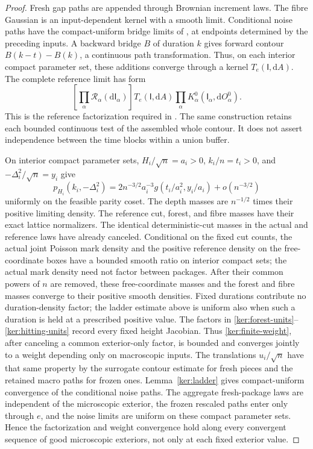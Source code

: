 \documentclass[11pt]{article}
\numberwithin{equation}{section}
\theoremstyle{definition}
\theoremstyle{remark}
\newcommand{\1}{\mathbf 1}
\begin{document}
\begin{proof}
Fresh gap paths are appended through Brownian increment laws.
The fibre Gaussian is an input-dependent kernel with a smooth limit.
Conditional noise paths have the compact-uniform bridge limits of
, at endpoints determined by the preceding inputs.
A backward bridge \(B\) of duration \(k\) gives forward contour
\(B(k-t)-B(k)\), a continuous path transformation. Thus, on each
interior compact parameter set, these additions converge through a
kernel \(T_e(\mathsf I,\mathrm d A)\). The complete reference limit has form
\begin{equation}\label{ker:augmented-reference-limit}
 \left[\prod_\alpha\mathcal R_\alpha(\mathrm d\mathsf I_\alpha)\right]
 T_e(\mathsf I,\mathrm d A)
 \prod_\alpha K^0_\alpha(\mathsf I_\alpha,\mathrm d O^0_\alpha).
\end{equation}
This is the reference factorization required in
. The same construction retains each bounded
continuous test of the assembled whole contour. It does not assert
independence between the time blocks within a union buffer.

On interior compact parameter sets, \(H_i/\sqrt n=a_i>0\),
\(k_i/n=t_i>0\), and \(-\Delta_i^2/\sqrt n=y_i\) give
\[
 p_{H_i}(k_i,-\Delta_i^2)
 =2n^{-3/2}a_i^{-3}g(t_i/a_i^2,y_i/a_i)+o(n^{-3/2})
\]
uniformly on the feasible parity coset.  The depth masses are
\(n^{-1/2}\) times their positive limiting density. The reference
cut, forest, and fibre masses have their exact lattice normalizers.
The identical deterministic-cut masses in the actual and reference
laws have already canceled. Conditional on the fixed cut counts,
the actual joint Poisson mark density and the positive reference
density on the free-coordinate boxes have a bounded smooth ratio
on interior compact sets; the actual mark density need not factor
between packages. After their common powers of \(n\) are removed,
these free-coordinate masses and the forest and fibre masses
converge to their positive smooth densities. Fixed durations
contribute no duration-density factor; the ladder estimate above is
uniform also when such a duration is held at a prescribed positive
value. The factors in
\eqref{ker:forest-units}--\eqref{ker:hitting-units} record every fixed
height Jacobian.  Thus \eqref{ker:finite-weight}, after canceling a
common exterior-only factor, is bounded and converges jointly to a
weight depending only on macroscopic inputs.  The translations
\(u_i/\sqrt n\) have that same property by the surrogate contour
estimate for fresh pieces and the retained macro paths for frozen
ones.  Lemma~\ref{ker:ladder} gives compact-uniform convergence of
the conditional noise paths. The aggregate fresh-package laws are
independent of the microscopic exterior, the frozen rescaled paths enter only through \(e\), and the
noise limits are uniform on these compact parameter sets. Hence the
factorization and weight convergence hold along every convergent
sequence of good microscopic exteriors, not only at each fixed
exterior value.


\end{proof}
\end{document}
